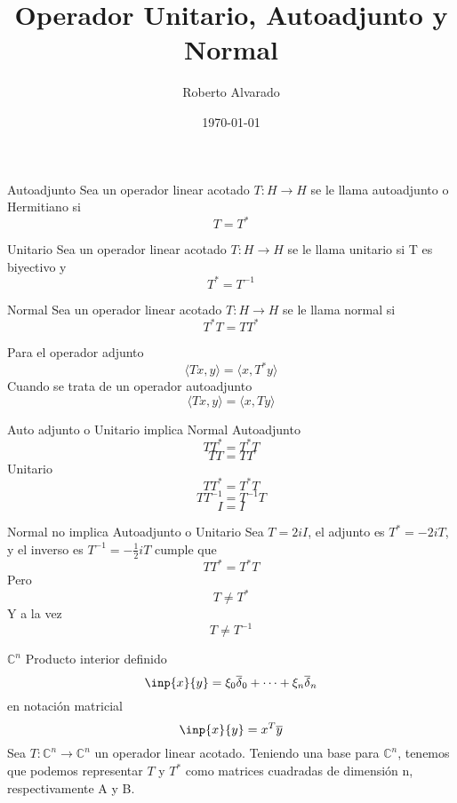 \documentclass{beamer}
\title{Operador Unitario, Autoadjunto y Normal}
\date{\today}
\author{Roberto Alvarado}
\institute{Universidad San Francisco de Quito}
\begin{document}
\begin{frame}
\maketitle
\end{frame}

\begin{frame}{Autoadjunto}
  Sea un operador linear acotado $T:H\longrightarrow H$ se le
  llama autoadjunto o Hermitiano si 
  $$T=T^{*}$$
\end{frame} 

\begin{frame}{Unitario}
  Sea un operador linear acotado $T:H\longrightarrow H$ se le
  llama unitario si T es biyectivo y
  $$T^{*} = T^{-1}$$
\end{frame}
  
\begin{frame}{Normal}
  Sea un operador linear acotado $T:H\longrightarrow H$ se le
  llama normal si
  $$T^{*}T = TT^{*} $$
\end{frame}

\begin{frame}
  Para el operador adjunto
  $$\langle Tx,y\rangle = \langle x,T^{*}y\rangle$$
  Cuando se trata de un operador autoadjunto
  $$\langle Tx,y\rangle = \langle x,Ty\rangle$$
\end{frame}

\begin{frame}{Auto adjunto o Unitario implica Normal}
  Autoadjunto
  $$TT^{*}=T^{*}T$$
  $$TT=TT$$
  Unitario
  $$TT^{*}=T^{*}T$$
  $$TT^{-1}=T^{-1}T$$
  $$I=I$$
\end{frame}

\begin{frame}{Normal no implica Autoadjunto o Unitario}
  Sea $T=2iI$, el adjunto es $T^{*}=-2iT$, y el inverso es $T^{-1} =
  -\frac{1}{2}iT$ cumple que
    $$TT^{*}=T^{*}T$$
    Pero 
    $$T\neq T^{*}$$
    Y a la vez
    $$T\neq T^{-1}$$
\end{frame}
\begin{frame}{$\mathbb{C}^n$}
  Producto interior definido
  $$\inp{x}{y} = \xi_0\overline \delta_0+\dots+\xi_n\overline\delta_n$$
  en notación matricial
  $$\inp{x}{y} = x^T\overline y$$
  Sea $T: \mathbb{C}^n\longrightarrow \mathbb{C}^n$ un operador linear
  acotado. Teniendo una base para $\mathbb{C}^n$, tenemos que podemos
  representar $T$ y $T^{*}$ como matrices cuadradas de dimensión n,
  respectivamente A y B.
\end{frame}
\end{document}
